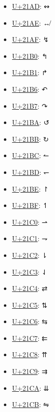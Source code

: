 \begin{itemize}
	\item \href{https://www.compart.com/en/unicode/U+21AD}{U+21AD}: ↭
	\item \href{https://www.compart.com/en/unicode/U+21AE}{U+21AE}: ↮
	\item \href{https://www.compart.com/en/unicode/U+21AF}{U+21AF}: ↯
	\item \href{https://www.compart.com/en/unicode/U+21B0}{U+21B0}: ↰
	\item \href{https://www.compart.com/en/unicode/U+21B1}{U+21B1}: ↱
	\item \href{https://www.compart.com/en/unicode/U+21B6}{U+21B6}: ↶
	\item \href{https://www.compart.com/en/unicode/U+21B7}{U+21B7}: ↷
	\item \href{https://www.compart.com/en/unicode/U+21BA}{U+21BA}: ↺
	\item \href{https://www.compart.com/en/unicode/U+21BB}{U+21BB}: ↻
	\item \href{https://www.compart.com/en/unicode/U+21BC}{U+21BC}: ↼
	\item \href{https://www.compart.com/en/unicode/U+21BD}{U+21BD}: ↽
	\item \href{https://www.compart.com/en/unicode/U+21BE}{U+21BE}: ↾
	\item \href{https://www.compart.com/en/unicode/U+21BF}{U+21BF}: ↿
	\item \href{https://www.compart.com/en/unicode/U+21C0}{U+21C0}: ⇀
	\item \href{https://www.compart.com/en/unicode/U+21C1}{U+21C1}: ⇁
	\item \href{https://www.compart.com/en/unicode/U+21C2}{U+21C2}: ⇂
	\item \href{https://www.compart.com/en/unicode/U+21C3}{U+21C3}: ⇃
	\item \href{https://www.compart.com/en/unicode/U+21C4}{U+21C4}: ⇄
	\item \href{https://www.compart.com/en/unicode/U+21C5}{U+21C5}: ⇅
	\item \href{https://www.compart.com/en/unicode/U+21C6}{U+21C6}: ⇆
	\item \href{https://www.compart.com/en/unicode/U+21C7}{U+21C7}: ⇇
	\item \href{https://www.compart.com/en/unicode/U+21C8}{U+21C8}: ⇈
	\item \href{https://www.compart.com/en/unicode/U+21C9}{U+21C9}: ⇉
	\item \href{https://www.compart.com/en/unicode/U+21CA}{U+21CA}: ⇊
	\item \href{https://www.compart.com/en/unicode/U+21CB}{U+21CB}: ⇋

\end{itemize}
